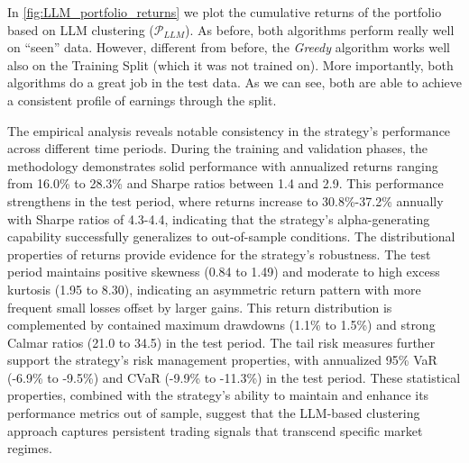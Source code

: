 In \cref{fig:LLM_portfolio_returns} we plot the cumulative returns of the portfolio based on LLM clustering ($\mathcal P_{LLM}$). As before, both algorithms perform really well on ``seen'' data. However, different from before, the \textit{Greedy} algorithm works well also on the Training Split (which it was not trained on). More importantly, both algorithms do a great job in the test data. As we can see, both are able to achieve a consistent profile of earnings through the split. 

The empirical analysis reveals notable consistency in the strategy's performance across different time periods. During the training and validation phases, the methodology demonstrates solid performance with annualized returns ranging from 16.0\% to 28.3\% and Sharpe ratios between 1.4 and 2.9. This performance strengthens in the test period, where returns increase to 30.8\%-37.2\% annually with Sharpe ratios of 4.3-4.4, indicating that the strategy's alpha-generating capability successfully generalizes to out-of-sample conditions. The distributional properties of returns provide evidence for the strategy's robustness. The test period maintains positive skewness (0.84 to 1.49) and moderate to high excess kurtosis (1.95 to 8.30), indicating an asymmetric return pattern with more frequent small losses offset by larger gains. This return distribution is complemented by contained maximum drawdowns (1.1\% to 1.5\%) and strong Calmar ratios (21.0 to 34.5) in the test period. The tail risk measures further support the strategy's risk management properties, with annualized 95\% VaR (-6.9\% to -9.5\%) and CVaR (-9.9\% to -11.3\%) in the test period. These statistical properties, combined with the strategy's ability to maintain and enhance its performance metrics out of sample, suggest that the LLM-based clustering approach captures persistent trading signals that transcend specific market regimes.


